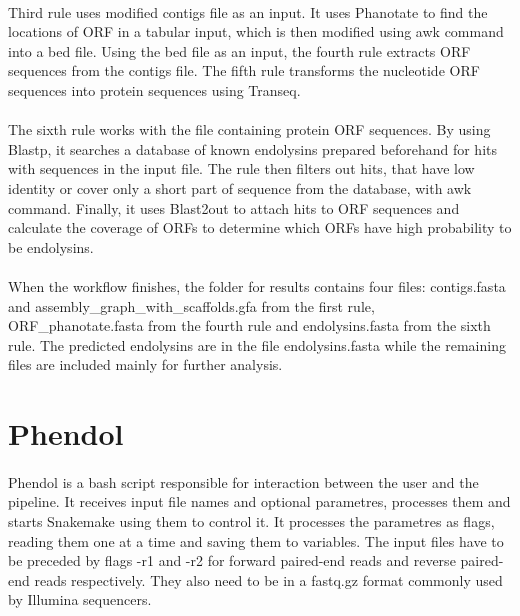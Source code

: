 \paragraph*{}
Third rule uses modified contigs file as an input. It uses Phanotate to find the locations of ORF in a tabular input, which is then modified using awk command into a bed file. Using the bed file as an input, the fourth rule extracts ORF sequences from the contigs file. The fifth rule transforms the nucleotide ORF sequences into protein sequences using Transeq.
\paragraph*{}
The sixth rule works with the file containing protein ORF sequences. By using Blastp, it searches a database of known endolysins prepared beforehand for hits with sequences in the input file. The rule then filters out hits, that have low identity or cover only a short part of sequence from the database, with awk command. Finally, it uses Blast2out to attach hits to ORF sequences and calculate the coverage of ORFs to determine which ORFs have high probability to be endolysins.
\paragraph*{}
When the workflow finishes, the folder for results contains four files: contigs.fasta and assembly\_graph\_with\_scaffolds.gfa from the first rule, ORF\_phanotate.fasta from the fourth rule and endolysins.fasta from the sixth rule. The predicted endolysins are in the file endolysins.fasta while the remaining files are included mainly for further analysis.

\section{Phendol}
\paragraph*{}
Phendol is a bash script responsible for interaction between the user and the pipeline. It receives input file names and optional parametres, processes them and starts Snakemake using them to control it. It processes the parametres as flags, reading them one at a time and saving them to variables. The input files have to be preceded by flags -r1 and -r2 for forward paired-end reads and reverse paired-end reads respectively. They also need to be in a fastq.gz format commonly used by Illumina sequencers.
